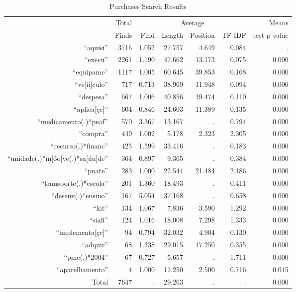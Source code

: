 \begin{table}[!htbp]
  \caption{\label{tab:purchasesresults} Purchases Search Results}
  \centering

  \begin{tabular}{rrrrrrr}
  \hline

  \hline
  & Total & \multicolumn{4}{c}{Average} & Means \\ \cline{3-6}
  & Finds & Find & Length & Position & TF-IDF & test p-value \\
  \hline
  ``aquisi'' & 3716 & 1.052 & 27.757 & 4.649 & 0.084 & . \\
  ``execu'' & 2261 & 1.190 & 47.662 & 13.173 & 0.075 & 0.000 \\
  ``equipame'' & 1117 & 1.005 & 60.645 & 39.853 & 0.168 & 0.000 \\
  ``ve{[}íi{]}culo'' & 717 & 0.713 & 38.969 & 11.948 & 0.094 & 0.000 \\
  ``despesa'' & 667 & 1.006 & 40.856 & 19.474 & 0.110 & 0.000 \\
  ``aplica{[}çc{]}'' & 604 & 0.846 & 24.603 & 11.389 & 0.135 & 0.000 \\
  ``medicamento(.)*peaf'' & 570 & 3.367 & 13.167 & . & 0.794 & 0.000 \\
  ``compra'' & 449 & 1.002 & 5.178 & 2.323 & 2.305 & 0.000 \\
  ``recurso(.)*financ'' & 425 & 1.599 & 33.416 & . & 0.183 & 0.000 \\
  ``unidade(.)*m{[}óo{]}ve(.)*sa{[}úu{]}de'' & 364 & 0.897 & 9.365 & . & 0.384 & 0.000 \\
  ``pnate'' & 283 & 1.000 & 22.544 & 21.484 & 2.186 & 0.000 \\
  ``transporte(.)*escola'' & 201 & 1.360 & 18.493 & . & 0.411 & 0.000 \\
  ``desenv(.)*ensino'' & 167 & 5.054 & 37.168 & . & 0.658 & 0.000 \\
  ``kit'' & 134 & 1.067 & 7.836 & 3.590 & 1.292 & 0.000 \\
  ``siafi'' & 124 & 1.016 & 18.008 & 7.298 & 1.333 & 0.000 \\
  ``implementa{[}çc{]}'' & 94 & 0.794 & 32.032 & 4.904 & 0.130 & 0.000 \\
  ``adquir'' & 68 & 1.338 & 29.015 & 17.250 & 0.355 & 0.000 \\
  ``pme(.)*2004'' & 67 & 0.727 & 5.657 & . & 1.711 & 0.000 \\
  ``aparelhamento'' & 4 & 1.000 & 11.250 & 2.500 & 0.716 & 0.045 \\ \hline
   Total & 7647 & . & 29.263 & . & . & 0.000 \\
  \hline

  \hline
  \end{tabular}
\end{table}
